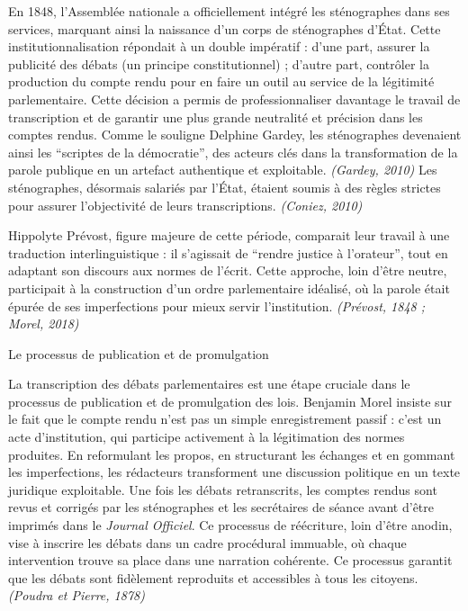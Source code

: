En 1848, l'Assemblée nationale a officiellement intégré les sténographes dans ses services, marquant ainsi la naissance d'un corps de sténographes d'État. Cette institutionnalisation répondait à un double impératif : d’une part, assurer la publicité des débats (un principe constitutionnel) ; d’autre part, contrôler la production du compte rendu pour en faire un outil au service de la légitimité parlementaire. Cette décision a permis de professionnaliser davantage le travail de transcription et de garantir une plus grande neutralité et précision dans les comptes rendus. Comme le souligne Delphine Gardey, les sténographes devenaient ainsi les \enquote{scriptes de la démocratie}, des acteurs clés dans la transformation de la parole publique en un artefact authentique et exploitable. \emph{(Gardey, 2010)} Les sténographes, désormais salariés par l'État, étaient soumis à des règles strictes pour assurer l'objectivité de leurs transcriptions. \emph{(Coniez, 2010)}

Hippolyte Prévost, figure majeure de cette période, comparait leur travail à une traduction interlinguistique : il s’agissait de \enquote{rendre justice à l’orateur}, tout en adaptant son discours aux normes de l’écrit. Cette approche, loin d’être neutre, participait à la construction d’un ordre parlementaire idéalisé, où la parole était épurée de ses imperfections pour mieux servir l’institution. \emph{(Prévost, 1848 ; Morel, 2018)}

 Le processus de publication et de promulgation

La transcription des débats parlementaires est une étape cruciale dans le processus de publication et de promulgation des lois. Benjamin Morel insiste sur le fait que le compte rendu n’est pas un simple enregistrement passif : c’est un acte d’institution, qui participe activement à la légitimation des normes produites. En reformulant les propos, en structurant les échanges et en gommant les imperfections, les rédacteurs transforment une discussion politique en un texte juridique exploitable. Une fois les débats retranscrits, les comptes rendus sont revus et corrigés par les sténographes et les secrétaires de séance avant d'être imprimés dans le \emph{Journal Officiel}. Ce processus de réécriture, loin d’être anodin, vise à inscrire les débats dans un cadre procédural immuable, où chaque intervention trouve sa place dans une narration cohérente. Ce processus garantit que les débats sont fidèlement reproduits et accessibles à tous les citoyens. \emph{(Poudra et Pierre, 1878)}

